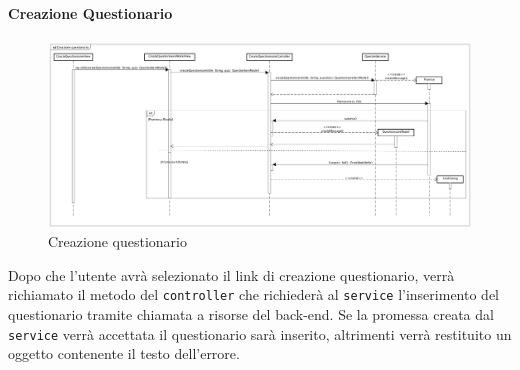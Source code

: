 \paragraph{Creazione Questionario}

\label{Creazione questionario}

\begin{figure}[ht]
	\centering
	\includegraphics[scale=0.25,keepaspectratio]{UML/DiagrammiDiSequenza/Front-end/QuestionnaireCreation.png}
	\caption{Creazione questionario}
\end{figure} \FloatBarrier

Dopo che l'utente avrà selezionato il link di creazione questionario, verrà richiamato il metodo del \texttt{controller} che richiederà al \texttt{service} l'inserimento del questionario tramite chiamata a risorse del back-end. Se la promessa creata dal \texttt{service} verrà accettata il questionario sarà inserito, altrimenti verrà restituito un oggetto contenente il testo dell'errore. 
